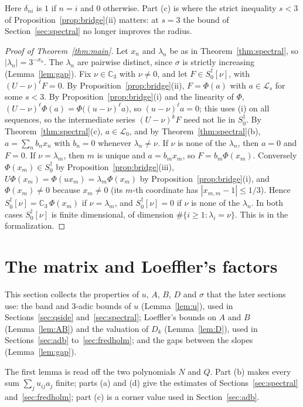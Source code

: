 \documentclass[11pt]{amsart}
\theoremstyle{definition}
\numberwithin{equation}{section}
\newcommand{\Cp}{\mathbb{C}_3}
\newcommand{\Sd}{S_0^{\dagger}}
\newcommand{\cL}{\mathcal{L}}
\newcommand{\Lc}{\mathcal{L}_0}
\newcommand{\sig}{\sigma}
\begin{document}
Here $\delta_{ni}$ is $1$ if $n=i$ and $0$ otherwise. Part (c) is where the strict inequality $s<3$ of Proposition~\ref{prop:bridge}(ii) matters: at $s=3$ the bound of Section~\ref{sec:spectral} no longer improves the radius.

\begin{proof}[Proof of Theorem~\ref{thm:main}]
Let $x_n$ and $\lambda_n$ be as in Theorem~\ref{thm:spectral}, so $|\lambda_n|=3^{-\sig_n}$. The $\lambda_n$ are pairwise distinct, since $\sig$ is strictly increasing (Lemma~\ref{lem:gap}). Fix $\nu\in\Cp$ with $\nu\ne0$, and let $F\in\Sd[\nu]$, with $(U-\nu)^\ell F=0$. By Proposition~\ref{prop:bridge}(ii), $F=\Phi(a)$ with $a\in\cL_s$ for some $s<3$. By Proposition~\ref{prop:bridge}(i) and the linearity of $\Phi$, $(U-\nu)^\ell\Phi(a)=\Phi\bigl((u-\nu)^\ell a\bigr)$, so $(u-\nu)^\ell a=0$; this uses (i) on all sequences, so the intermediate series $(U-\nu)^kF$ need not lie in $\Sd$. By Theorem~\ref{thm:spectral}(c), $a\in\Lc$, and by Theorem~\ref{thm:spectral}(b), $a=\sum_nb_nx_n$ with $b_n=0$ whenever $\lambda_n\ne\nu$. If $\nu$ is none of the $\lambda_n$, then $a=0$ and $F=0$. If $\nu=\lambda_m$, then $m$ is unique and $a=b_mx_m$, so $F=b_m\Phi(x_m)$. Conversely $\Phi(x_m)\in\Sd$ by Proposition~\ref{prop:bridge}(iii), $U\Phi(x_m)=\Phi(ux_m)=\lambda_m\Phi(x_m)$ by Proposition~\ref{prop:bridge}(i), and $\Phi(x_m)\ne0$ because $x_m\ne0$ (its $m$-th coordinate has $|x_{m,m}-1|\le1/3$). Hence $\Sd[\nu]=\Cp\,\Phi(x_m)$ if $\nu=\lambda_m$, and $\Sd[\nu]=0$ if $\nu$ is none of the $\lambda_n$. In both cases $\Sd[\nu]$ is finite dimensional, of dimension $\#\{i\ge1:\lambda_i=\nu\}$. This is  in the formalization.
\end{proof}

\section{The matrix and Loeffler's factors}\label{sec:factors}

This section collects the properties of $u$, $A$, $B$, $D$ and $\sig$ that the later sections use: the band and $3$-adic bounds of $u$ (Lemma~\ref{lem:u}), used in Sections~\ref{sec:qside} and~\ref{sec:spectral}; Loeffler's bounds on $A$ and $B$ (Lemma~\ref{lem:AB}) and the valuation of $D_k$ (Lemma~\ref{lem:D}), used in Sections~\ref{sec:adb} to~\ref{sec:fredholm}; and the gaps between the slopes (Lemma~\ref{lem:gap}).

The first lemma is read off the two polynomials $N$ and $Q$. Part (b) makes every sum $\sum_ju_{ij}a_j$ finite; parts (a) and (d) give the estimates of Sections~\ref{sec:spectral} and~\ref{sec:fredholm}; part (c) is a corner value used in Section~\ref{sec:adb}.
\end{document}
